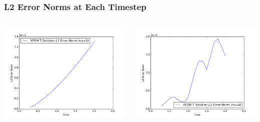 \documentclass[]{beamer}
\begin{document}
\begin{frame}[t]\frametitle{L2 Error Norms at Each Timestep}
  	\begin{columns}
			\begin{center}
			\includegraphics[scale=0.3]{figures/1D_xy_ls1mat_nx1_L2_Errs}
			\end{center}
			\begin{center}
			\includegraphics[scale=0.3]{figures/1D_xy_ls1mat_nx4_L2_Errs}
			\end{center}
	\end{columns}
\end{frame}
\end{document}
